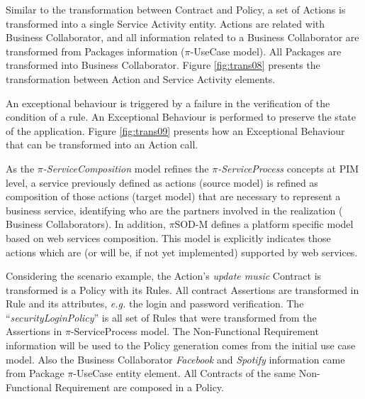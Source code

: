 Similar to the transformation between {\sc Contract} and
{\sc Policy}, a set of {\sc Actions} is transformed into a single {\sc Service
Activity} entity. {\sc Actions} are related with {\sc Business Collaborator},
and all information related to a {\sc Business Collaborator} are transformed
from {\sc Packages} information ($\pi$-UseCase model). All {\sc Packages}
are transformed into {\sc Business Collaborator}. Figure \ref{fig:trans08}
presents the transformation between {\sc Action} and {\sc Service Activity}
elements.

An exceptional behaviour is triggered by a failure in the verification of the
condition of a rule. An {\sc Exceptional Behaviour}
is performed to preserve the state of the application. Figure
\ref{fig:trans09} presents how an {\sc Exceptional Behaviour} that can be
transformed into an {\sc Action} call.

As the \textit{$\pi$-ServiceComposition} model refines the
\textit{$\pi$-ServiceProcess} concepts at PIM level, a service
previously defined as actions (source model) is refined as composition of
those actions (target model) that are necessary to represent a business
service, identifying who are the partners involved in the realization ({\sc
Business Collaborators}). In addition, $\pi$SOD-M defines a platform specific
model based on web services composition. This model is explicitly
indicates those actions which are (or will be, if not yet implemented) supported
by web services. 

\begin{exampl}
Considering the scenario example, the {\sc
Action}'s \textit{update music} {\sc Contract} is transformed is a {\sc Policy}
with its {\sc Rules}. All contract {\sc Assertions} are transformed in {\sc
Rule} and its attributes, \textit{e.g.} the login and password verification.  The
``\textit{securityLoginPolicy}'' is all set of {\sc Rules} that were transformed
from the {\sc Assertions} in $\pi$-ServiceProcess model. The {\sc Non-Functional
Requirement} information will be used to the {\sc Policy} generation comes from
the initial use case model. Also the {\sc Business Collaborator}
\textit{Facebook} and \textit{Spotify} information came from {\sc Package}
$\pi$-UseCase entity element. All {\sc Contracts} of the same {\sc
Non-Functional Requirement} are composed in a {\sc Policy}.
\end{exampl}



